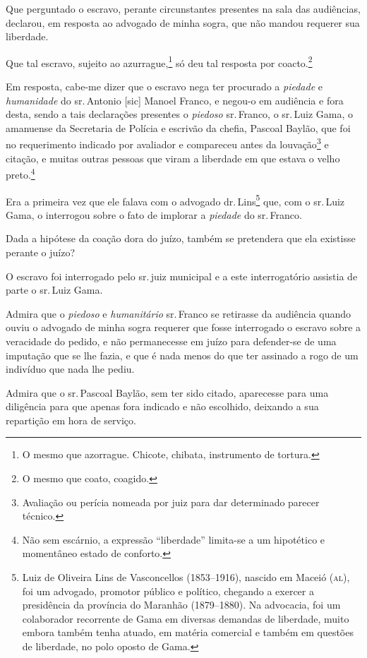 Que perguntado o escravo, perante circunstantes presentes na sala das
audiências, declarou, em resposta ao advogado de minha sogra, que não
mandou requerer sua liberdade.

Que tal escravo, sujeito ao azurrague,\footnote{ O mesmo que azorrague.
  Chicote, chibata, instrumento de tortura.} só deu tal resposta por
coacto.\footnote{ O mesmo que coato, coagido.}

Em resposta, cabe-me dizer que o escravo nega ter procurado a
\emph{piedade} e \emph{humanidade} do sr.\,Antonio {[}sic{]} Manoel
Franco, e negou-o em audiência e fora desta, sendo a tais declarações
presentes o \emph{piedoso} sr.\,Franco, o sr.\,Luiz Gama, o amanuense da
Secretaria de Polícia e escrivão da chefia, Pascoal Baylão, que foi no
requerimento indicado por avaliador e compareceu antes da
louvação\footnote{ Avaliação ou perícia nomeada por juiz para dar
  determinado parecer técnico.} e citação, e muitas outras pessoas que
viram a liberdade em que estava o velho preto.\footnote{Não sem
  escárnio, a expressão ``liberdade'' limita-se a um hipotético e
  momentâneo estado de conforto.}

Era a primeira vez que ele falava com o advogado dr.\,Lins\footnote{
  Luiz de Oliveira Lins de Vasconcellos (1853--1916), nascido em Maceió
  (\textsc{al}), foi um advogado, promotor público e político, chegando a exercer
  a presidência da província do Maranhão (1879--1880). Na advocacia, foi
  um colaborador recorrente de Gama em diversas demandas de liberdade,
  muito embora também tenha atuado, em matéria comercial e também em
  questões de liberdade, no polo oposto de Gama.} que, com o sr.\,Luiz
Gama, o interrogou sobre o fato de implorar a \emph{piedade} do sr.\,Franco.

Dada a hipótese da coação dora do juízo, também se pretendera que ela
existisse perante o juízo?

O escravo foi interrogado pelo sr.\,juiz municipal e a este
interrogatório assistia de parte o sr.\,Luiz Gama.

Admira que o \emph{piedoso} e \emph{humanitário} sr.\,Franco se retirasse
da audiência quando ouviu o advogado de minha sogra requerer que fosse
interrogado o escravo sobre a veracidade do pedido, e não permanecesse
em juízo para defender-se de uma imputação que se lhe fazia, e que é
nada menos do que ter assinado a rogo de um indivíduo que nada lhe
pediu.

Admira que o sr.\,Pascoal Baylão, sem ter sido citado, aparecesse para
uma diligência para que apenas fora indicado e não escolhido, deixando a
sua repartição em hora de serviço.


